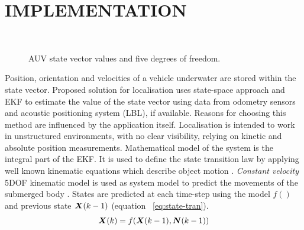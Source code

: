 \section{IMPLEMENTATION}  \label{sec:implementation}
\begin{figure}%
  \centering
     \\
\caption{AUV state vector values and five degrees of freedom.}
\label{fig:auv-states}
\vspace{-10pt}
\end{figure}
Position, orientation and velocities of a vehicle underwater are stored within the state vector. Proposed solution for localisation uses state-space approach and EKF to estimate the value of the state vector using data from odometry sensors and acoustic positioning system (LBL), if available. Reasons for choosing this method are influenced by the application itself. Localisation is intended to work in unstructured environments, with no clear visibility, relying on kinetic and absolute position measurements.
Mathematical model of the system is the integral part of the EKF. It is used to define the state transition law by applying well known kinematic equations which describe object motion \cite{thrun05}. \textit{Constant velocity} 5DOF kinematic model is used as system model to predict the movements of the submerged body \cite{ribas10}. States are predicted at each time-step using the model $f()$ and previous state $\boldsymbol{X}(k-1)$ (equation ~\ref{eq:state-tran}).
\begin{equation}
\boldsymbol{X}(k) = f(\boldsymbol{X}(k-1), \boldsymbol{N}(k-1))
\label{eq:state-tran}
\end{equation}

